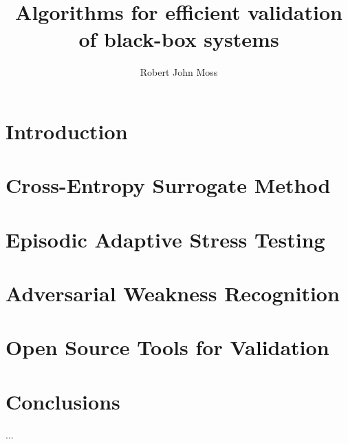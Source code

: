 \documentclass{report}
\def\includebody{} %
\begin{document}
\title{Algorithms for efficient validation of black-box systems}
\author{Robert John Moss}


\beforepreface
{}

% 

\afterpreface

\renewcommand{\chaptermark}[1]{ \markboth{\textsc{#1}}{} }
\renewcommand{\sectionmark}[1]{ \markright{\textsc{#1}}{} }



\chapter{Introduction}


\ifdefined\includebody
    \chapter{Cross-Entropy Surrogate Method}\label{cha:cem_variants}
    

    \chapter{Episodic Adaptive Stress Testing}\label{cha:episodic_ast}
    

    \chapter{Adversarial Weakness Recognition}\label{cha:weakness_rec}
    

    \chapter{Open Source Tools for Validation}\label{cha:tooling}
    
\fi

\chapter{Conclusions}
...

\appendix
\ifdefined\includebody
    
\fi

% 
% 
\printbibliography
\end{document}
